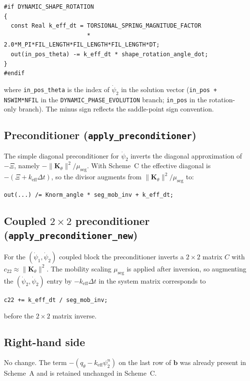 \documentclass[11pt]{article}
\newcommand{\dt}{\Delta t}
\newcommand{\keff}{k_\mathrm{eff}}
\newcommand{\Kth}{\mathbf{K}_\theta}
\begin{document}
\begin{verbatim}
#if DYNAMIC_SHAPE_ROTATION
{
  const Real k_eff_dt = TORSIONAL_SPRING_MAGNITUDE_FACTOR
                        * 2.0*M_PI*FIL_LENGTH*FIL_LENGTH*FIL_LENGTH*DT;
  out(in_pos_theta) -= k_eff_dt * shape_rotation_angle_dot;
}
#endif
\end{verbatim}

\noindent where \texttt{in\_pos\_theta} is the index of $\dot\psi_2$ in
the solution vector (\texttt{in\_pos + NSWIM*NFIL} in the
\texttt{DYNAMIC\_PHASE\_EVOLUTION} branch; \texttt{in\_pos} in the
rotation-only branch).  The minus sign reflects the saddle-point sign
convention.

\subsection*{Preconditioner (\texttt{apply\_preconditioner})}

The simple diagonal preconditioner for $\dot\psi_2$ inverts the
diagonal approximation of $-\Xi$, namely $-\|\Kth\|^2/\mu_\mathrm{seg}$.
With Scheme~C the effective diagonal is $-(\Xi + \keff\dt)$, so the
divisor augments from $\|\Kth\|^2/\mu_\mathrm{seg}$ to:
\begin{verbatim}
out(...) /= Knorm_angle * seg_mob_inv + k_eff_dt;
\end{verbatim}

\subsection*{Coupled $2\times2$ preconditioner
             (\texttt{apply\_preconditioner\_new})}

For the $(\dot\psi_1,\dot\psi_2)$ coupled block the preconditioner
inverts a $2\times2$ matrix $C$ with $c_{22}\approx\|\Kth\|^2$.
The mobility scaling $\mu_\mathrm{seg}$ is applied after inversion, so
augmenting the $(\dot\psi_2,\dot\psi_2)$ entry by $-\keff\dt$ in the
system matrix corresponds to
\begin{verbatim}
c22 += k_eff_dt / seg_mob_inv;
\end{verbatim}
before the $2\times2$ matrix inverse.

\subsection*{Right-hand side}

No change.  The term $-(q_\theta-\keff\psi_2^n)$ on the last row of
$\mathbf{b}$ was already present in Scheme~A and is retained unchanged
in Scheme~C.
\end{document}
